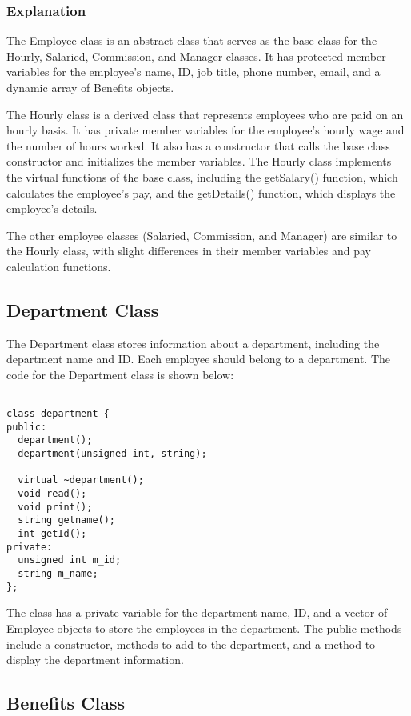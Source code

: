 \documentclass{article}
\begin{document}
\subsubsection{Explanation}

The Employee class is an abstract class that serves as the base class for the Hourly, Salaried, Commission, and Manager classes. It has protected member variables for the employee's name, ID, job title, phone number, email, and a dynamic array of Benefits objects.

The Hourly class is a derived class that represents employees who are paid on an hourly basis. It has private member variables for the employee's hourly wage and the number of hours worked. It also has a constructor that calls the base class constructor and initializes the member variables. The Hourly class implements the virtual functions of the base class, including the getSalary() function, which calculates the employee's pay, and the getDetails() function, which displays the employee's details.

The other employee classes (Salaried, Commission, and Manager) are similar to the Hourly class, with slight differences in their member variables and pay calculation functions.

\subsection{Department Class}

The Department class stores information about a department, including the department name and ID. Each employee should belong to a department. The code for the Department class is shown below:

\begin{verbatim}

class department {
public:
  department();
  department(unsigned int, string);

  virtual ~department();
  void read();
  void print();
  string getname();
  int getId();
private:
  unsigned int m_id;
  string m_name;
};

\end{verbatim}

The class has a private variable for the department name, ID, and a vector of Employee objects to store the employees in the department. The public methods include a constructor, methods to add to the department, and a method to display the department information.

\subsection{Benefits Class}
\end{document}
